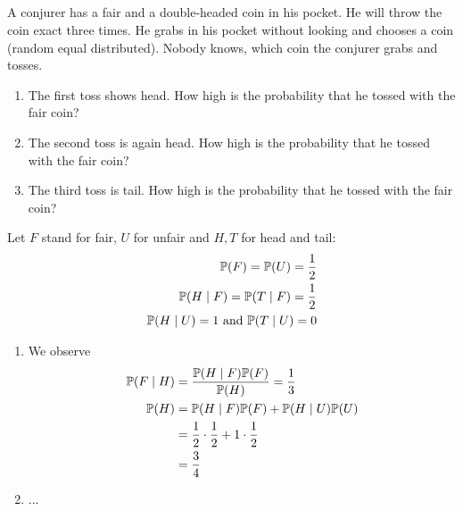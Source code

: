 \subsection{}
A conjurer has a fair and a double-headed coin in his pocket. He will throw the coin exact three times. He grabs in his pocket without looking and chooses a coin (random equal distributed). Nobody knows, which coin the conjurer grabs and tosses.
\begin{enumerate}
	\item The first toss shows head. How high is the probability that he tossed with the fair coin?
	\item The second toss is again head. How high is the probability that he tossed with the fair coin?
	\item The third toss is tail. How high is the probability that he tossed with the fair coin?
\end{enumerate}
\begin{solution}
	Let $F$ stand for fair, $U$ for unfair and $H, T$ for head and tail:
	\begin{align*}
		\mathbb{P}(F) = \mathbb{P}(U) = \frac{1}{2}\\
		\mathbb{P}(H \mid F) = \mathbb{P}(T \mid F) = \frac{1}{2}\\
		\mathbb{P}(H \mid U) = 1 \text{ and } \mathbb{P}(T \mid U) = 0
	\end{align*}
	\begin{enumerate}
		\item We observe
		\begin{align*}
			\mathbb{P}(F \mid H) &= \frac{\mathbb{P}(H \mid F)\mathbb{P}(F)}{\mathbb{P}(H)} = \frac{1}{3}\\
			\mathbb{P}(H) &= \mathbb{P}(H \mid F)\mathbb{P}(F) + \mathbb{P}(H \mid U)\mathbb{P}(U)\\
			&= \frac{1}{2} \cdot \frac{1}{2} + 1 \cdot \frac{1}{2}\\
			&= \frac{3}{4}
		\end{align*}
		\item ... %
	\end{enumerate}
\end{solution}
